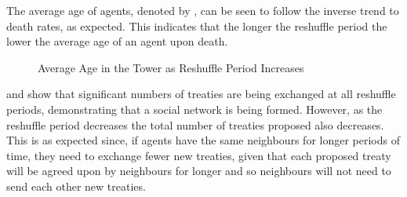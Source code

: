 The average age of agents, denoted by , can be seen to follow the inverse trend to death rates, as expected. This indicates that the longer the reshuffle period the lower the average age of an agent upon death. 
\begin{figure}[H] %
    \centering
    \begin{minipage}{0.8\textwidth}
    \end{minipage}
    \caption{Average Age in the Tower as Reshuffle Period Increases}
    \label{fig:Average-Age-as-Shuffle-Period-Decreases}
\end{figure}

 and  show that significant numbers of treaties are being exchanged at all reshuffle periods, demonstrating that a social network is being formed. However, as the reshuffle period decreases the total number of treaties proposed also decreases. This is as expected since, if agents have the same neighbours for longer periods of time, they need to exchange fewer new treaties, given that each proposed treaty will be agreed upon by neighbours for longer and so neighbours will not need to send each other new treaties. 

